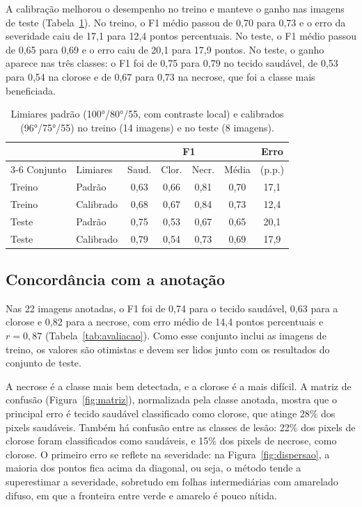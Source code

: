 \documentclass[10pt,a4paper,twocolumn]{article}
\begin{document}
A calibração melhorou o desempenho no treino e manteve o ganho nas imagens de teste (Tabela~\ref{tab:calibracao}). No treino, o F1 médio passou de 0,70 para 0,73 e o erro da severidade caiu de 17,1 para 12,4 pontos percentuais. No teste, o F1 médio passou de 0,65 para 0,69 e o erro caiu de 20,1 para 17,9 pontos. No teste, o ganho aparece nas três classes: o F1 foi de 0,75 para 0,79 no tecido saudável, de 0,53 para 0,54 na clorose e de 0,67 para 0,73 na necrose, que foi a classe mais beneficiada.

\begin{table}[H]
\centering
\caption{Limiares padrão (100°/80°/55, com contraste local) e calibrados (96°/75°/55) no treino (14 imagens) e no teste (8 imagens).}
\label{tab:calibracao}
\small
\setlength{\tabcolsep}{3.5pt}
\begin{tabular}{llccccc}
\toprule
 & & \multicolumn{4}{c}{F1} & Erro \\
\cmidrule(lr){3-6}
Conjunto & Limiares & Saud. & Clor. & Necr. & Média & (p.p.) \\
\midrule
Treino & Padrão    & 0,63 & 0,66 & 0,81 & 0,70 & 17,1 \\
Treino & Calibrado & 0,68 & 0,67 & 0,84 & 0,73 & 12,4 \\
\midrule
Teste  & Padrão    & 0,75 & 0,53 & 0,67 & 0,65 & 20,1 \\
Teste  & Calibrado & 0,79 & 0,54 & 0,73 & 0,69 & 17,9 \\
\bottomrule
\end{tabular}
\end{table}

\subsection{Concordância com a anotação}

Nas 22 imagens anotadas, o F1 foi de 0,74 para o tecido saudável, 0,63 para a clorose e 0,82 para a necrose, com erro médio de 14,4 pontos percentuais e $r = 0{,}87$ (Tabela~\ref{tab:avaliacao}). Como esse conjunto inclui as imagens de treino, os valores são otimistas e devem ser lidos junto com os resultados do conjunto de teste.

A necrose é a classe mais bem detectada, e a clorose é a mais difícil. A matriz de confusão (Figura~\ref{fig:matriz}), normalizada pela classe anotada, mostra que o principal erro é tecido saudável classificado como clorose, que atinge 28\% dos pixels saudáveis. Também há confusão entre as classes de lesão: 22\% dos pixels de clorose foram classificados como saudáveis, e 15\% dos pixels de necrose, como clorose. O primeiro erro se reflete na severidade: na Figura~\ref{fig:dispersao}, a maioria dos pontos fica acima da diagonal, ou seja, o método tende a superestimar a severidade, sobretudo em folhas intermediárias com amarelado difuso, em que a fronteira entre verde e amarelo é pouco nítida.
\end{document}

